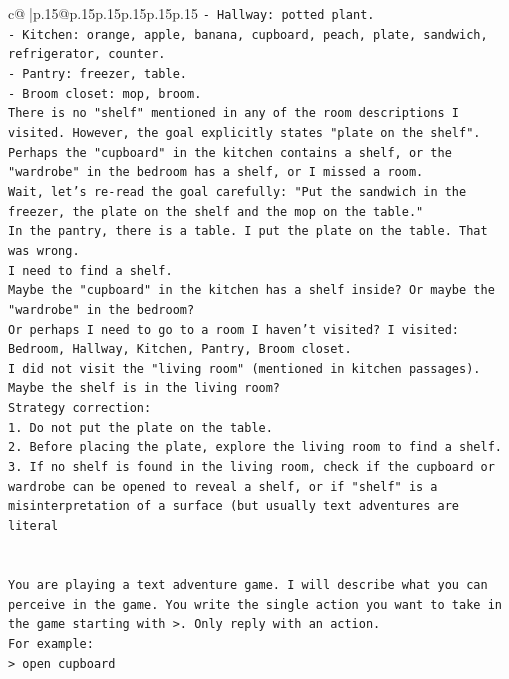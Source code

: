 \documentclass{article}
\begin{document}
{\begin{supertabular}{c@{$\;$}|p{.15\linewidth}@{}p{.15\linewidth}p{.15\linewidth}p{.15\linewidth}p{.15\linewidth}p{.15\linewidth}}
{{{\texttt{{-} Hallway: potted plant.} \\
\texttt{{-} Kitchen: orange, apple, banana, cupboard, peach, plate, sandwich, refrigerator, counter.} \\
\texttt{{-} Pantry: freezer, table.} \\
\texttt{{-} Broom closet: mop, broom.} \\
\texttt{There is no "shelf" mentioned in any of the room descriptions I visited. However, the goal explicitly states "plate on the shelf".} \\
\texttt{Perhaps the "cupboard" in the kitchen contains a shelf, or the "wardrobe" in the bedroom has a shelf, or I missed a room.} \\
\texttt{Wait, let's re{-}read the goal carefully: "Put the sandwich in the freezer, the plate on the shelf and the mop on the table."} \\
\texttt{In the pantry, there is a table. I put the plate on the table. That was wrong.} \\
\texttt{I need to find a shelf.} \\
\texttt{Maybe the "cupboard" in the kitchen has a shelf inside? Or maybe the "wardrobe" in the bedroom?} \\
\texttt{Or perhaps I need to go to a room I haven't visited? I visited: Bedroom, Hallway, Kitchen, Pantry, Broom closet.} \\
\texttt{I did not visit the "living room" (mentioned in kitchen passages).} \\
\texttt{Maybe the shelf is in the living room?} \\
\texttt{Strategy correction:} \\
\texttt{1. Do not put the plate on the table.} \\
\texttt{2. Before placing the plate, explore the living room to find a shelf.} \\
\texttt{3. If no shelf is found in the living room, check if the cupboard or wardrobe can be opened to reveal a shelf, or if "shelf" is a misinterpretation of a surface (but usually text adventures are literal} \\
\\ 
\\ 
\texttt{You are playing a text adventure game. I will describe what you can perceive in the game. You write the single action you want to take in the game starting with >. Only reply with an action.} \\
\texttt{For example:} \\
\texttt{> open cupboard} \\
}}}
\end{supertabular}}
\end{document}
